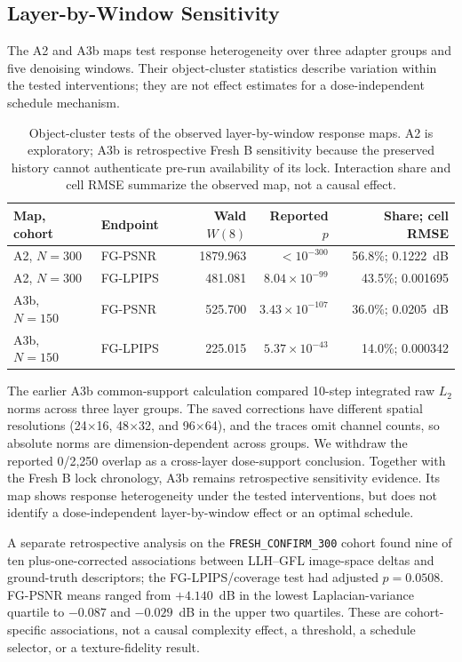 \documentclass[times,twocolumn,final]{elsarticle}
\begin{document}
\subsection{Layer-by-Window Sensitivity}
\label{subsec:layerwindow}

The A2 and A3b maps test response heterogeneity over three adapter groups and five denoising windows. Their object-cluster statistics describe variation within the tested interventions; they are not effect estimates for a dose-independent schedule mechanism.

\begin{table}[t]
\centering
\scriptsize
\setlength{\tabcolsep}{3pt}
\caption{Object-cluster tests of the observed layer-by-window response maps. A2 is exploratory; A3b is retrospective Fresh B sensitivity because the preserved history cannot authenticate pre-run availability of its lock. Interaction share and cell RMSE summarize the observed map, not a causal effect.}
\label{tab:layerwindow-main}
\begin{tabular}{llrrr}
\toprule
Map, cohort & Endpoint & Wald $W(8)$ & Reported $p$ & Share; cell RMSE \\
\midrule
A2, $N=300$ & FG-PSNR & 1879.963 & $<10^{-300}$ & 56.8\%; 0.1222~dB \\
A2, $N=300$ & FG-LPIPS & 481.081 & $8.04\times10^{-99}$ & 43.5\%; 0.001695 \\
A3b, $N=150$ & FG-PSNR & 525.700 & $3.43\times10^{-107}$ & 36.0\%; 0.0205~dB \\
A3b, $N=150$ & FG-LPIPS & 225.015 & $5.37\times10^{-43}$ & 14.0\%; 0.000342 \\
\bottomrule
\end{tabular}
\end{table}

The earlier A3b common-support calculation compared 10-step integrated raw $L_2$ norms across three layer groups. The saved corrections have different spatial resolutions (24$\times$16, 48$\times$32, and 96$\times$64), and the traces omit channel counts, so absolute norms are dimension-dependent across groups. We withdraw the reported 0/2,250 overlap as a cross-layer dose-support conclusion. Together with the Fresh B lock chronology, A3b remains retrospective sensitivity evidence. Its map shows response heterogeneity under the tested interventions, but does not identify a dose-independent layer-by-window effect or an optimal schedule.

A separate retrospective analysis on the \texttt{FRESH\_CONFIRM\_300} cohort found nine of ten plus-one-corrected associations between LLH--GFL image-space deltas and ground-truth descriptors; the FG-LPIPS/coverage test had adjusted $p=0.0508$. FG-PSNR means ranged from $+4.140$~dB in the lowest Laplacian-variance quartile to $-0.087$ and $-0.029$~dB in the upper two quartiles. These are cohort-specific associations, not a causal complexity effect, a threshold, a schedule selector, or a texture-fidelity result.
\end{document}
